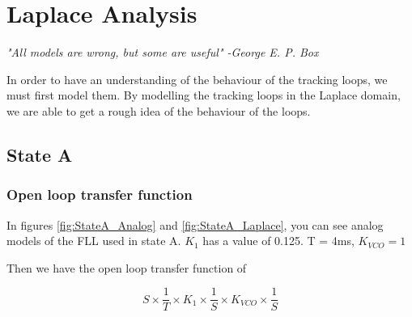\label{app2}
\chapter{Laplace Analysis}

\emph{"All models are wrong, but some are useful" -George E. P. Box}


\begin{table}[!htb]
\caption{Test inputs for evaluating errors \cite{Nise}}
\label{tab:LaplaceTestInputs}
\end{table}






In order to have an understanding of the behaviour of the tracking loops, we must first model them. By modelling the tracking loops in the Laplace domain, we are able to get a rough idea of the behaviour of the loops. 

\section{State A}
\subsection{Open loop transfer function}
In figures \ref{fig:StateA_Analog} and \ref{fig:StateA_Laplace}, you can see analog models of the FLL used in state A. $K_1$ has a value of 0.125. T = 4ms, $K_{VCO} = 1$

Then we have the open loop transfer function of 

\begin{equation}
S \times \frac{1}{T} \times K_1 \times \frac{1}{S} \times  
K_{VCO} \times \frac{1}{S}
\end{equation}

